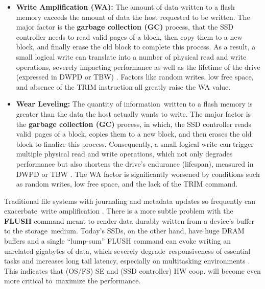 \documentclass[12pt]{article}
\begin{document}
\begin{itemize}
    \item \textbf{Write Amplification (WA):} The amount of data written to a flash memory exceeds the amount of data the host requested to be written. The major factor is the \textbf{garbage collection (GC)} process, that the SSD controller needs to read valid pages of a block, then copy them to a new block, and finally erase the old block to complete this process. As a result, a small logical write can translate into a number of physical read and write operations, severely impacting performance as well as the lifetime of the drive (expressed in DWPD or TBW) \parencite{Viking2017AN0035}. Factors like random writes, low free space, and absence of the TRIM instruction all greatly raise the WA value.
    \item \textbf{Wear Leveling:} The quantity of information written to a flash memory is greater than the data the host actually wants to write. The major factor is the \textbf{garbage collection (GC)} process, in which, the SSD controller reads valid pages of a block, copies them to a new block, and then erases the old block to finalize this process. Consequently, a small logical write can trigger multiple physical read and write operations, which not only degrades performance but also shortens the drive's endurance (lifespan), measured in DWPD or TBW \parencite{Viking2017AN0035}. The WA factor is significantly worsened by conditions such as random writes, low free space, and the lack of the TRIM command.
\end{itemize} 

Traditional file systems with journaling and metadata updates so frequently can exacerbate write amplification \parencite{Lu2013Extending}. There is a more subtle problem with the \textbf{FLUSH} command meant to render data durably written from a device’s buffer to the storage medium. Today’s SSDs, on the other hand, have huge DRAM buffers and a single “lump-sum” FLUSH command can evoke writing an unrelated gigabytes of data, which severely degrade responsiveness of essential tasks and increases long tail latency, especially on multitasking environments \parencite{Yeon2018RFLUSH}. This indicates that (OS/FS) SE and (SSD controller) HW coop. will become even more critical to maximize the performance.

\end{document}
